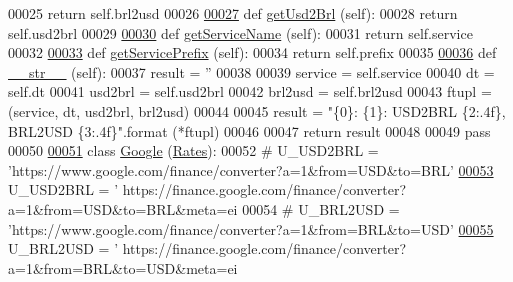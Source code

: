 \begin{DoxyCode}
00025         \textcolor{keywordflow}{return} self.brl2usd
00026     
\hypertarget{rates_8py_source.tex_l00027}{}\hyperlink{namespacerates_ae4c7203ef8a919f9cf522581ca00b08a}{00027}     \textcolor{keyword}{def }\hyperlink{namespacerates_ae4c7203ef8a919f9cf522581ca00b08a}{getUsd2Brl} (self):
00028         \textcolor{keywordflow}{return} self.usd2brl
00029     
\hypertarget{rates_8py_source.tex_l00030}{}\hyperlink{namespacerates_a5dd7b6601bc66e313c26984e32f1e290}{00030}     \textcolor{keyword}{def }\hyperlink{namespacerates_a5dd7b6601bc66e313c26984e32f1e290}{getServiceName} (self):
00031         \textcolor{keywordflow}{return} self.service
00032     
\hypertarget{rates_8py_source.tex_l00033}{}\hyperlink{namespacerates_aafc179b32863137b88c74dd0ee2576bd}{00033}     \textcolor{keyword}{def }\hyperlink{namespacerates_aafc179b32863137b88c74dd0ee2576bd}{getServicePrefix} (self):
00034         \textcolor{keywordflow}{return} self.prefix
00035         
\hypertarget{rates_8py_source.tex_l00036}{}\hyperlink{namespacerates_a2f1a70c33ee9e255938e4c19fd207264}{00036}     \textcolor{keyword}{def }\hyperlink{namespacerates_a2f1a70c33ee9e255938e4c19fd207264}{\_\_str\_\_} (self):
00037         result = \textcolor{stringliteral}{''}
00038 
00039         service = self.service
00040         dt      = self.dt
00041         usd2brl = self.usd2brl
00042         brl2usd = self.brl2usd
00043         ftupl = (service, dt, usd2brl, brl2usd)
00044         
00045         result = \textcolor{stringliteral}{"\{0\}: \{1\}: USD2BRL \{2:.4f\}, BRL2USD \{3:.4f\}"}.format (*ftupl)
00046 
00047         \textcolor{keywordflow}{return} result        
00048     
00049     \textcolor{keywordflow}{pass} 
00050     
\hypertarget{rates_8py_source.tex_l00051}{}\hyperlink{classrates_1_1_google}{00051} \textcolor{keyword}{class }\hyperlink{classrates_1_1_google}{Google} (\hyperlink{classrates_1_1_rates}{Rates}):
00052     \textcolor{comment}{#    U\_USD2BRL = 'https://www.google.com/finance/converter?a=1&from=USD&to=BRL'}
\hypertarget{rates_8py_source.tex_l00053}{}\hyperlink{classrates_1_1_google_a77ef7f5932c48b002697fb187a234d4a}{00053}     U\_USD2BRL = \textcolor{stringliteral}{'
      https://finance.google.com/finance/converter?a=1&from=USD&to=BRL&meta=ei%
00054 \textcolor{comment}{#    U\_BRL2USD = 'https://www.google.com/finance/converter?a=1&from=BRL&to=USD'}
\hypertarget{rates_8py_source.tex_l00055}{}\hyperlink{classrates_1_1_google_a46dbc3fa0a110bf5b66808c29642cfa1}{00055}     U\_BRL2USD = \textcolor{stringliteral}{'
      https://finance.google.com/finance/converter?a=1&from=BRL&to=USD&meta=ei%
}}
\end{DoxyCode}
